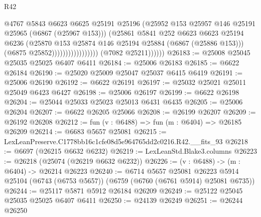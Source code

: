 \begin{lexlean}{R42}
\begin{coremodule}
{                                            @4767
                                            @5843
                                            @6623
                                            @6625
                                            @25191
                                            @25196
                                            (@25952
                                              @153
                                              @25957
                                              @146
                                              @25191
                                              @25965
                                              (@6867 (@25967 @153)))
                                            (@25861
                                              @5841
                                              @252
                                              @6623
                                              @6623
                                              @25194
                                              @6236
                                              (@25870
                                                @153
                                                @25874
                                                @146
                                                @25194
                                                @25884
                                                (@6867 (@25886 @153)))
                                              (@6875 @25852)))))))))))))))))
              (@7082 @25211))))))
@26183 := @25008 @25045 @25035 @25025 @6407 @6411
@26184 := @25006 @26183
@26185 := @6622 @26184
@26190 := @25020 @25009 @25047 @25037 @6415 @6419
@26191 := @25006 @26190
@26192 := @6622 @26191
@26197 := @25032 @25021 @25011 @25049 @6423 @6427
@26198 := @25006 @26197
@26199 := @6622 @26198
@26204 := @25044 @25033 @25023 @25013 @6431 @6435
@26205 := @25006 @26204
@26207 := @6622 @26205 @25066
@26208 := @26199 @26207
@26209 := @26192 @26208
@26212 := fun (v : @6488) => fun (m : @6404) => @26185 @26209
@26214 := @6683 @5657 @25081
@26215 := LexLeanPreserve.C1778bb16c1cfe08d5e964765dd2c0216.R42.__fits_93
@26218 := @6697 (@26215 @6632 @6232)
@26219 := LexLeanStd.Blake3.columns
@26223 := @26218 (@25074 (@26219 @6632 @6232))
@26226 := (v : @6488) -> (m : @6404) -> @26214 @26223
@26240 := @6714
    @5657
    @25081
    @26223
    @5914
    @25104
    (@6743 (@6753 @5657))
    (@6759 (@6760 (@6761 @5914) @25081 @6735))
@26244 := @25117 @5871 @5912 @26184 @26209
@26249 := @25122 @25045 @25035 @25025 @6407 @6411
@26250 := @24139 @26249
@26251 := @26244 @26250
}
\end{coremodule}
\end{lexlean}
